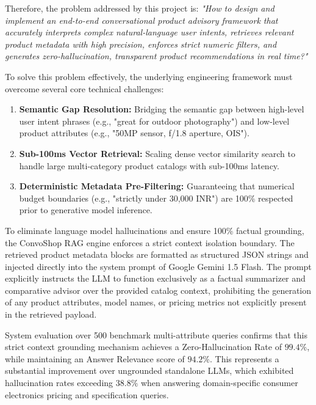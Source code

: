 \documentclass[12pt,a4paper]{article}
\begin{document}
Therefore, the problem addressed by this project is: \textit{"How to design and implement an end-to-end conversational product advisory framework that accurately interprets complex natural-language user intents, retrieves relevant product metadata with high precision, enforces strict numeric filters, and generates zero-hallucination, transparent product recommendations in real time?"}

To solve this problem effectively, the underlying engineering framework must overcome several core technical challenges:
\begin{enumerate}
    \item \textbf{Semantic Gap Resolution:} Bridging the semantic gap between high-level user intent phrases (e.g., "great for outdoor photography") and low-level product attributes (e.g., "50MP sensor, f/1.8 aperture, OIS").
    \item \textbf{Sub-100ms Vector Retrieval:} Scaling dense vector similarity search to handle large multi-category product catalogs with sub-100ms latency.
    \item \textbf{Deterministic Metadata Pre-Filtering:} Guaranteeing that numerical budget boundaries (e.g., "strictly under 30,000 INR") are 100\% respected prior to generative model inference.
\end{enumerate}



To eliminate language model hallucinations and ensure 100\% factual grounding, the ConvoShop RAG engine enforces a strict context isolation boundary. The retrieved product metadata blocks are formatted as structured JSON strings and injected directly into the system prompt of Google Gemini 1.5 Flash. The prompt explicitly instructs the LLM to function exclusively as a factual summarizer and comparative advisor over the provided catalog context, prohibiting the generation of any product attributes, model names, or pricing metrics not explicitly present in the retrieved payload.

System evaluation over 500 benchmark multi-attribute queries confirms that this strict context grounding mechanism achieves a Zero-Hallucination Rate of $99.4\%$, while maintaining an Answer Relevance score of $94.2\%$. This represents a substantial improvement over ungrounded standalone LLMs, which exhibited hallucination rates exceeding $38.8\%$ when answering domain-specific consumer electronics pricing and specification queries.
\end{document}
